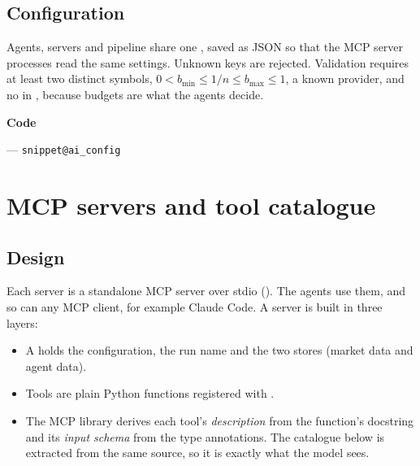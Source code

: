 \documentclass[11pt,a4paper]{article}
\makeatletter
\newcommand{\snippetsource}[1]{\csname snippet@#1\endcsname}
\newenvironment{codepointers}{%
  \par\smallskip\begingroup\footnotesize\noindent\textcolor{blue!50!black}{\textbf{Code}}\par\nopagebreak
  \begin{list}{}{\setlength{\leftmargin}{1.2em}\setlength{\itemsep}{0pt}\setlength{\parsep}{0pt}\setlength{\topsep}{1pt}}}%
  {\end{list}\endgroup\smallskip}
\newcommand{\codeitem}[2]{\item #2 --- \texttt{\snippetsource{#1}}}
\makeatother
\begin{document}
\subsection{Configuration}\label{sec:aiconfig}
Agents, servers and pipeline share one , saved as JSON so that the MCP server
processes read the same settings. Unknown keys are rejected. Validation requires at least
two distinct symbols, $0<b_{\min}\le1/n\le b_{\max}\le1$, a known provider, and no
 in , because budgets are what the agents decide.
\begin{center}\footnotesize

\end{center}
\begin{codepointers}
  \codeitem{ai_config}{}
\end{codepointers}

\section{MCP servers and tool catalogue}\label{sec:tools}

\subsection{Design}
Each server is a standalone MCP server over stdio
(). The agents
use them, and so can any MCP client, for example Claude Code. A server is built in three
layers:
\begin{itemize}
  \item A  holds the configuration, the run name and the two stores
        (market data and agent data).
  \item Tools are plain Python functions registered with .
  \item The MCP library derives each tool's \emph{description} from the function's
        docstring and its \emph{input schema} from the type annotations. The catalogue
        below is extracted from the same source, so it is exactly what the model sees.
\end{itemize}
\end{document}
